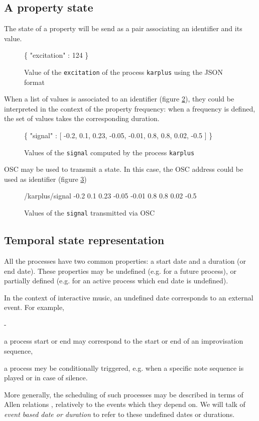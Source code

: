 \documentclass{article}
\newenvironment{state}
{ \begin{list}
	{-}
	{	 \setlength{\leftmargin}{6mm}
	 	\setlength{\itemsep}{-3pt}}
}
{ \end{list} }
\newcommand{\defs}	[1]		{ 	\begin{center}\colorbox{mygrey}{
								\begin{minipage}[t]{0.99\columnwidth} 
								\ttfamily \small #1 
								\end{minipage}}\end{center}}
\newcommand{\verbcaption}[1]	{ \vspace{-5mm} \caption{#1}}
\begin{document}

\subsection{A property state}
The state of a property will be send as a pair associating an identifier and its value.

\begin{figure}[h]
\defs{
\{ "excitation" : 124 \}
}
\verbcaption{Value of the \texttt{excitation} of the process \texttt{karplus} using the JSON format}
\label{fig:excit}
\end{figure}

When a list of values is associated to an identifier (figure \ref{fig:sign}), they could be interpreted in the context of the property frequency: when a frequency is defined, the set of values takes the corresponding duration.
\begin{figure}[h]
\defs{
 \{ "signal" : [ -0.2, 0.1, 0.23, -0.05, -0.01, 0.8, 0.8, 0.02, -0.5 ]  \}
}
\verbcaption{Values of the \texttt{signal} computed by the process \texttt{karplus}}
\label{fig:sign}
\end{figure}

OSC \cite{OSC} may be used to transmit a state. In this case, the OSC address could be used as identifier (figure \ref{fig:osc})
\begin{figure}[h]
\defs{
 /karplus/signal -0.2  0.1  0.23  -0.05  -0.01  0.8  0.8  0.02  -0.5
}
\verbcaption{Values of the \texttt{signal} transmitted via OSC}
\label{fig:osc}
\end{figure}


\subsection{Temporal state representation}
All the processes have two common properties: a start date and a duration (or end date). These properties may be undefined (e.g. for a future process), or partially defined (e.g. for an active process which end date is undefined).

In the context of interactive music, an undefined date corresponds to an external event. For example,
\begin{state}
\item a process start or end may correspond to the start or end of an improvisation sequence,
\item a process mey be conditionally triggered, e.g. when a specific note sequence is played or in case of silence.
\end{state}
More generally, the scheduling of such processes may be described in terms of Allen relations \cite{Allen:1983:MKT:182.358434}, relatively to the events which they depend on. We will talk of \emph{event based date or duration} to refer to these undefined dates or durations.
\end{document}
